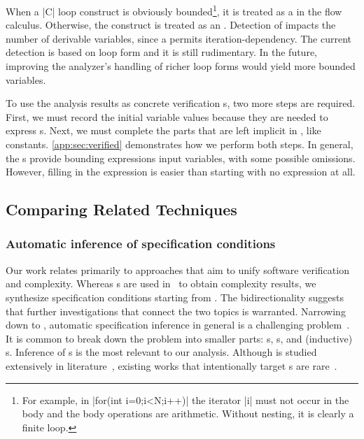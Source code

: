 When a \pr|C| loop construct is obviously bounded\footnote{For example,
in \pr|for(int i=0;i<N;i++)| the iterator \pr|i| must
not occur in the body and the body operations are arithmetic. Without nesting,
it is clearly a finite loop.}, it is treated as a  in the flow
calculus. Otherwise, the construct is treated as an
. Detection of  impacts the number of
derivable variables, since a  permits
iteration-dependency. The current detection
is based on loop form and it is still rudimentary. In the future, improving the
analyzer's handling of richer loop forms would yield more bounded variables.

To use the analysis results as concrete verification
s, two more steps are required. First, we
must record the initial variable values because they are needed to express
s. Next, we must complete the parts that are left implicit in
, like constants. \autoref{app:sec:verified} demonstrates how we
perform both steps. In general, the s provide bounding
expressions \wrt input variables, with some possible omissions. However, filling
in the expression is easier than starting with no expression at all.

\subsection{Comparing Related Techniques}
\label{sec:related-works}

\subsubsection{Automatic inference of specification conditions}
\label{subsec:automatic-inference}

Our work relates primarily to approaches that aim to unify software verification
and complexity. Whereas s are used in~\cite{nguyen2017} to
obtain complexity results, we synthesize specification conditions starting from
. The bidirectionality suggests that further
investigations that connect the two topics is warranted. Narrowing down to
, automatic specification inference in general is a
challenging problem~\cite{dillig2013,yu2023}. It is common to break down the
problem into smaller parts: s, s, and
(inductive) s. Inference of
s is the most relevant to our analysis. Although
 is studied extensively in
literature~\cite{karr1976,cousot1978,colon2003,sankaranarayanan2004,dillig2013,si2018,ryan2020,yao2020,yu2023,nguyen2014,nguyen2017},
existing works that intentionally target s are
rare~\cite{popeea2006,molina2021}.


